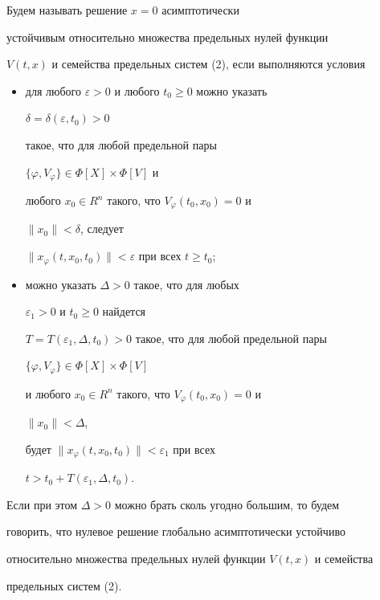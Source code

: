\begin{defnnonum} Будем называть решение $x=0$ асимптотически 


устойчивым относительно множества предельных нулей функции 


$V(t,x)$ и семейства предельных систем (2), если выполняются условия 


\begin{itemize} 


 


\item[1.] для любого $\varepsilon>0$ и любого $t_0\ge 0$ можно указать 


$\delta=\delta(\varepsilon,t_0)>0$ 


такое, что для любой предельной пары 


$\{\varphi,V_\varphi\}\in\Phi[X]\times\Phi[V]$ и 


любого $x_0\in R^n$ такого, что $V_\varphi(t_0,x_0)=0$ и 


$\|x_0\|<\delta$, следует


$\|x_\varphi(t,x_0,t_0)\|<\varepsilon$ при всех $t\ge t_0$; 


\item[2.] можно указать $\Delta>0$ такое, что для любых 


$\varepsilon_1>0$ и $t_0\ge 0$ найдется 


$T=T(\varepsilon_1,\Delta,t_0)>0$ такое, что для любой предельной пары 


$\{\varphi,V_\varphi\}\in\Phi[X]\times\Phi[V]$ 


и любого $x_0\in R^n$ такого, что $V_\varphi(t_0,x_0)=0$ и 


$\|x_0\|<\Delta$, 


будет $\|x_\varphi(t,x_0,t_0)\|<\varepsilon_1$ при всех 


$t>t_0+T(\varepsilon_1,\Delta,t_0)$. 


\end{itemize} 


 


Если при этом $\Delta>0$ можно брать сколь угодно большим, то будем 


говорить, что нулевое решение глобально асимптотически устойчиво 


относительно множества предельных нулей функции $V(t,x)$ и семейства 


предельных систем (2). 


\end{defnnonum} 


